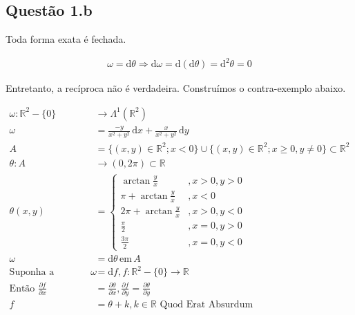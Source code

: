 \documentclass[12pt,a4paper]{article}
\begin{document}
		\begin{flushright}
		\end{flushright}

	\subsection{Quest\~ao 1.b}
		\begin{flushright}
		\end{flushright}

		Toda forma exata \'e fechada.

		\begin{align}
			\omega = \mathrm{d}\theta \Rightarrow \mathrm{d}\omega = \mathrm{d}(\mathrm{d}\theta) = \mathrm{d}^2\theta = 0
		\end{align}

		Entretanto, a rec\'iproca n\~ao \'e verdadeira. Constru\'imos o contra-exemplo abaixo.

		\begin{align}
			\omega : \mathbb{R}^2 - \{0\} &\rightarrow \Lambda^1(\mathbb{R}^2) \\
			\omega &= \frac{-y}{x^2 + y^2} \,\mathrm{d}x + \frac{x}{x^2 + y^2} \,\mathrm{d}y \\
			A &= \{(x,y) \in \mathbb{R}^2 ; x < 0\} \cup  \{(x,y) \in \mathbb{R}^2 ; x \ge 0, y \neq 0\} \subset \mathbb{R}^2 \\
			\theta : A &\rightarrow (0, 2\pi) \subset \mathbb{R} \\
			\theta(x,y) &= \left\{
				\begin{aligned}
					\arctan \frac{y}{x}&, x > 0, y > 0 \\
					\pi + \arctan \frac{y}{x}&, x < 0 \\
					2 \pi + \arctan \frac{y}{x}&, x > 0, y < 0 \\
					\frac{\pi}{2}&, x = 0, y > 0 \\
					\frac{3 \pi}{2}&, x = 0, y < 0
				\end{aligned}
			\right. \\
			\omega &= \mathrm{d}\theta\,\mathrm{em\,}A \\
			\text{Suponha a extens\~ao}\,\,\omega &= \mathrm{d}f, f : \mathbb{R}^2 - \{0\} \rightarrow \mathbb{R} \\
			\text{Ent\~ao}\,\,\frac{\partial f}{\partial x} &= \frac{\partial \theta}{\partial x}, \frac{\partial f}{\partial y} = \frac{\partial \theta}{\partial y} \\
			f &= \theta + k, k \in \mathbb{R} \text{ Quod Erat Absurdum}
		\end{align}
\end{document}
